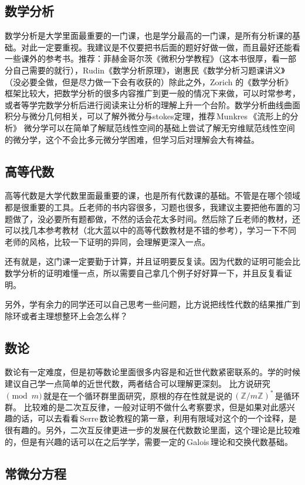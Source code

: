 \subsection{数学分析}
数学分析是大学里面最重要的一门课，也是学分最高的一门课，是所有分析课的基础。对此一定要重视。我建议是不仅要把书后面的题好好做一做，而且最好还能看一些课外的参考书。推荐：菲赫金哥尔茨《微积分学教程》（这本书很厚，看一部分自己需要的就行），Rudin《数学分析原理》，谢惠民《数学分析习题课讲义》（没必要全做，但是尽力做一下会有收获的）除此之外，Zorich 的《数学分析》框架比较大，把数学分析的很多内容推广到更一般的情况下来做，可以时常参考，或者等学完数学分析后进行阅读来让分析的理解上升一个台阶。数学分析曲线曲面积分与微分几何相关，可以了解外微分与stokes定理，推荐\,Munkres\,《流形上的分析》
微分学可以在简单了解赋范线性空间的基础上尝试了解无穷维赋范线性空间的微分学，这个不会比多元微分学困难，但学习后对理解会大有裨益。
\subsection{高等代数}
高等代数是大学代数里面最重要的课，也是所有代数课的基础。不管是在哪个领域都是很重要的工具。丘老师的书内容很多，习题也很多，我建议主要把他布置的习题做了，没必要所有题都做，不然的话会花太多时间。然后除了丘老师的教材，还可以找几本参考教材（北大蓝以中的高等代数教材是不错的参考），学习一下不同老师的风格，比较一下证明的异同，会理解更深入一点。\par
还有就是，这门课一定要勤于计算，并且证明要反复读。因为代数的证明可能会比数学分析的证明难懂一点，所以需要自己拿几个例子好好算一下，并且反复看证明。\par
另外，学有余力的同学还可以自己思考一些问题，比方说把线性代数的结果推广到除环或者主理想整环上会怎么样？


\subsection{数论}

数论有一定难度，但是初等数论里面很多内容是和近世代数紧密联系的。学的时候建议自己学一点简单的近世代数，两者结合可以理解更深刻。
比方说研究\,$\pmod{m}$\,就是在一个循环群里面研究，原根的存在性就是说的\,$(\mathbb{Z}/m\mathbb{Z})^*$\,是循环群。
比较难的是二次互反律，一般对证明不做什么考察要求，但是如果对此感兴趣的话，可以去看看\,Serre\,数论教程的第一章，利用有限域对这个的一个诠释，是很有趣的。另外，二次互反律更进一步的发展在代数数论里面，这个理论是比较难的，但是有兴趣的话可以在之后学学，需要一定的\,Galois\,理论和交换代数基础。

\subsection{常微分方程}

